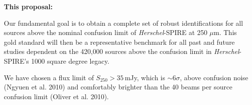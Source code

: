 \documentclass[12pt,a4paper]{article}
\newcommand{\herschel}{{\it Herschel}}
\newcommand{\ea}{et~al.}
\newcommand{\micron}{$\mu$m}
\begin{document}




{\bf This proposal:}
%

Our fundamental goal is to obtain a complete set of robust identifications for all sources above the nominal confusion limit of \herschel-SPIRE at 250 \micron. This gold standard will then be a representative benchmark for all past and future studies dependent on the 420,000 sources above the confusion limit in \herschel-SPIRE's 1000 square degree legacy.

We have chosen a flux limit of $S_{250}>35$\,mJy, which is $\sim 6\sigma$, above confusion noise (Ngyuen et al. 2010) and comfortably brighter than the 40 beams per source confusion limit (Oliver et al. 2010). 
\end{document}
